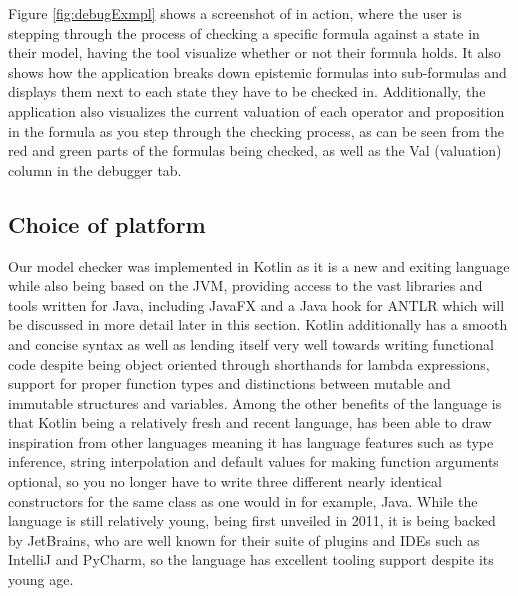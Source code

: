 Figure \ref{fig:debugExmpl} shows a screenshot of \cname{} in action, where the user is stepping through the process of checking a specific formula against a state in their model, having the tool visualize whether or not their formula holds. It also shows how the application breaks down epistemic formulas into sub-formulas and displays them next to each state they have to be checked in. Additionally, the application also visualizes the current valuation of each operator and proposition in the formula as you step through the checking process, as can be seen from the red and green parts of the formulas being checked, as well as the Val (valuation) column in the debugger tab. 

\subsection{Choice of platform}


Our model checker was implemented in Kotlin as it is a new and exiting language while also being based on the JVM, providing access to the vast libraries and tools written for Java, including JavaFX and a Java hook for ANTLR which will be discussed in more detail later in this section. Kotlin additionally has a smooth and concise syntax as well as lending itself very well towards writing functional code despite being object oriented through shorthands for lambda expressions, support for proper function types and distinctions between mutable and immutable structures and variables. Among the other benefits of the language is that Kotlin being a relatively fresh and recent language, has been able to draw inspiration from other languages meaning it has language features such as type inference, string interpolation and default values for making function arguments optional, so you no longer have to write three different nearly identical constructors for the same class as one would in for example, Java. While the language is still relatively young, being first unveiled in 2011\cite{KotlinHello}, it is being backed by JetBrains, who are well known for their suite of plugins and IDEs such as IntelliJ and PyCharm, so the language has excellent tooling support despite its young age.

